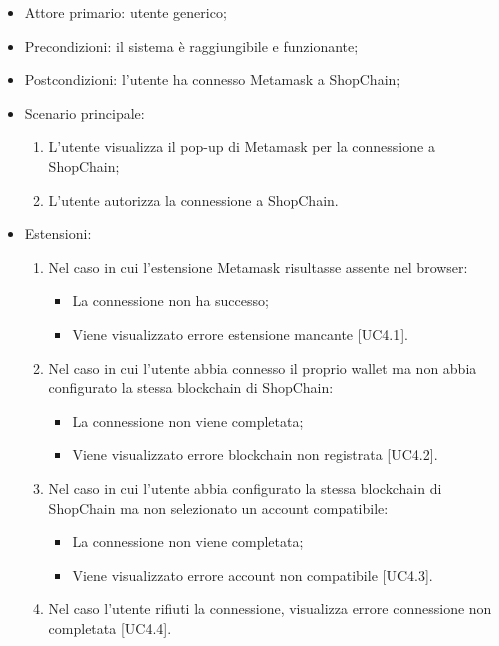 \begin{itemize}
    \item Attore primario: utente generico;
    \item Precondizioni: il sistema è raggiungibile e funzionante;
    \item Postcondizioni: l'utente ha connesso Metamask\glo{} a ShopChain;
    \item Scenario principale:
        \begin{enumerate}
            \item L'utente visualizza il pop-up di Metamask\glo{} per la connessione a ShopChain;
            \item L'utente autorizza la connessione a ShopChain.
        \end{enumerate}
    \item Estensioni:
        \begin{enumerate}
            \item Nel caso in cui l'estensione Metamask\glo{} risultasse assente nel browser:
                \begin{itemize}
                    \item La connessione non ha successo;
                    \item Viene visualizzato errore estensione mancante [UC4.1].
                \end{itemize}
            \item Nel caso in cui l'utente abbia connesso il proprio wallet\glo{} ma non abbia configurato la stessa blockchain\glo{} di ShopChain:
                \begin{itemize}
                    \item La connessione non viene completata;
                    \item Viene visualizzato errore blockchain\glo{} non registrata [UC4.2].
                \end{itemize}
            \item Nel caso in cui l'utente abbia configurato la stessa blockchain\glo{} di ShopChain ma non selezionato un account compatibile:
                \begin{itemize}
                    \item La connessione non viene completata;
                    \item Viene visualizzato errore account non compatibile [UC4.3].
                \end{itemize}
            \item Nel caso l'utente rifiuti la connessione, visualizza errore connessione non completata [UC4.4].
        \end{enumerate}
\end{itemize}

